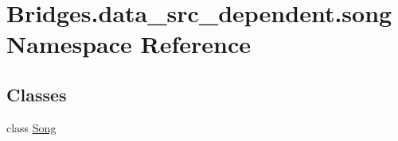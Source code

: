 \hypertarget{namespace_bridges_1_1data__src__dependent_1_1song}{}\section{Bridges.\+data\+\_\+src\+\_\+dependent.\+song Namespace Reference}
\label{namespace_bridges_1_1data__src__dependent_1_1song}
\subsection*{Classes}
\begin{DoxyCompactItemize}
\item 
class \hyperlink{class_bridges_1_1data__src__dependent_1_1song_1_1_song}{Song}
\end{DoxyCompactItemize}
